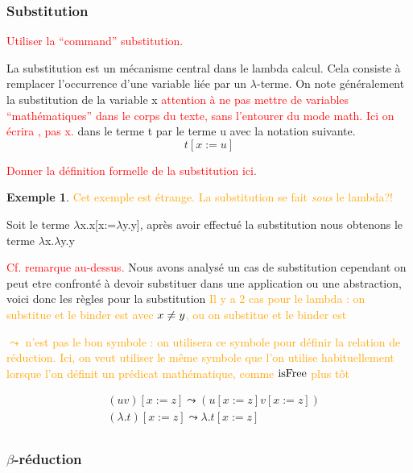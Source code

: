 \documentclass {article}
\theoremstyle{definition}
\newtheorem{example}{Exemple}
\theoremstyle{remark}
\newcommand{\todo}[1]{\textcolor{red}{#1}}
\newcommand{\attention}[1]{\textcolor{orange}{#1}}
\begin{document}
\subsubsection{Substitution}

\newcommand{\subst}[3]{#1[#2 := #3]}

\todo{Utiliser la ``command'' substitution.}

La substitution est un mécanisme central dans le lambda calcul. Cela consiste 
à remplacer l'occurrence d'une variable liée par un \(\lambda\)-terme.
On note généralement la substitution de la variable x \todo{attention à ne pas mettre de variables ``mathématiques'' dans le corps du texte, sans l'entourer du mode math. Ici on écrira \Var{x}, pas x.} dans le terme t par le 
terme u avec la notation suivante. 
\[ 
\subst{t}{x}{u}
\]

\todo{Donner la définition formelle de la substitution ici.}

\begin{example}
  \attention{Cet exemple est étrange. La substitution se fait \emph{sous} le lambda?!}

  Soit le terme \(\lambda\)x.x[x:=\(\lambda\)y.y], après avoir effectué la
  substitution nous obtenons le terme \(\lambda\)x.\(\lambda\)y.y
\end{example}


\todo{Cf. remarque au-dessus.} Nous avons analysé un cas de
substitution cependant on peut etre confronté à devoir substituer dans
une application ou une abstraction, voici donc les règles pour la
substitution \attention{Il y a 2 cas pour le lambda : on substitue
   et le binder est \Var{y} avec $x \neq y$, ou on
  substitue \Var{x} et le binder est \Var{x}}

\attention{$\leadsto$ n'est pas le bon symbole : on utilisera ce
  symbole pour définir la relation de réduction. Ici, on veut utiliser
  le même symbole que l'on utilise habituellement lorsque l'on définit
  un prédicat mathématique, comme $\mathrm{isFree}$ plus tôt}

\begin{align*}
&(u v)[x := z]\leadsto(u[x := z] v[x := z]) \\
&(\lambda .t)[x := z]\leadsto\lambda .t[x := z] \\
\end{align*}

\subsubsection{$\beta$-réduction}
\end{document}
